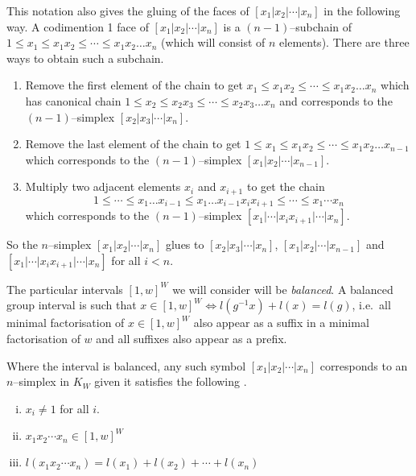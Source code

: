 \documentclass[class=article, crop=false]{standalone}
\begin{document}
This notation also gives the gluing of the faces of $[x_1 | x_2 | \cdots | x_n]$ in the following way.
A codimention 1 face of $[x_1 | x_2 | \cdots | x_n]$ is a $(n-1)$--subchain of $1 \leq x_1 \leq x_1x_2 \leq \cdots \leq x_1x_2\ldots x_n$ (which will consist of $n$ elements). There are three ways to obtain such a subchain.
\begin{enumerate}
	\item \label{item:gluing_step_1} Remove the first element of the chain to get $x_1 \leq x_1x_2 \leq \cdots \leq x_1x_2\ldots x_n$ which has canonical chain $1 \leq x_2 \leq x_2x_3 \leq \cdots \leq x_2x_3\ldots x_n$ and corresponds to the $(n-1)$--simplex $[x_2 | x_3 | \cdots | x_n]$.
	\item \label{item:gluing_step_2} Remove the last element of the chain to get $1 \leq x_1 \leq x_1x_2 \leq \cdots \leq x_1x_2\ldots x_{n-1}$ which corresponds to the $(n-1)$--simplex $[x_1 | x_2 | \cdots | x_{n-1}]$.
	\item \label{item:gluing_step_3} Multiply two adjacent elements $x_i$ and $x_{i+1}$ to get the chain
	      \begin{equation*}
		      1 \leq \cdots \leq x_1 \ldots x_{i-1} \leq x_1 \ldots x_{i-1}x_ix_{i+1} \leq \cdots \leq x_1\cdots x_n
	      \end{equation*}
	      which corresponds to the $(n-1)$--simplex $[x_1| \cdots | x_ix_{i+1} | \cdots |x_n]$.
\end{enumerate}

So the $n$--simplex $[x_1 | x_2 | \cdots | x_n]$ glues to $[x_2|x_3|\cdots|x_n]$, $[x_1|x_2|\cdots|x_{n-1}]$ and \newline $[x_1| \cdots | x_ix_{i+1} | \cdots |x_n]$ for all $i<n$.

The particular intervals $[1,w]^W$ we will consider will be \emph{balanced}. A balanced group interval is such that  $x \in [1,w]^W \iff l(g^{-1}x) + l(x) = l(g)$, i.e.~all minimal factorisation of $x \in [1,w]^W$ also appear as a suffix in a minimal factorisation of $w$ and all suffixes also appear as a prefix.

Where the interval is balanced, any such symbol  $[x_1 | x_2 | \cdots | x_n]$ corresponds to an $n$--simplex in $K_{W}$ given it satisfies the following \cite[Definition 2.8]{paolini_salvetti_kpi1_2021}.
\begin{enumerate}[i)]
	\item \label{item:interval_complex_requirement_1} $x_i \neq 1$ for all $i$.
	\item \label{item:interval_complex_requirement_2} $x_1 x_2 \cdots x_n \in [1,w]^W$
	\item \label{item:interval_complex_requirement_3} $l(x_1x_2\cdots x_n) = l(x_1) + l(x_2) + \cdots + l(x_n)$
\end{enumerate}
\end{document}
